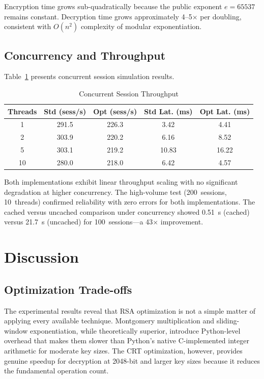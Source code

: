 \documentclass[conference]{IEEEtran}
\begin{document}
Encryption time grows sub-quadratically because the public exponent $e = 65537$ remains constant. Decryption time grows approximately 4--5$\times$ per doubling, consistent with $O(n^2)$ complexity of modular exponentiation.

\subsection{Concurrency and Throughput}

Table~\ref{tab:concurrency} presents concurrent session simulation results.

\begin{table}[htbp]
\caption{Concurrent Session Throughput}
\begin{center}
\begin{tabular}{|c|c|c|c|c|}
\hline
\textbf{Threads} & \textbf{Std (sess/s)} & \textbf{Opt (sess/s)} & \textbf{Std Lat. (ms)} & \textbf{Opt Lat. (ms)} \\
\hline
1 & 291.5 & 226.3 & 3.42 & 4.41 \\
\hline
2 & 303.9 & 220.2 & 6.16 & 8.52 \\
\hline
5 & 303.1 & 219.2 & 10.83 & 16.22 \\
\hline
10 & 280.0 & 218.0 & 6.42 & 4.57 \\
\hline
\end{tabular}
\label{tab:concurrency}
\end{center}
\end{table}

Both implementations exhibit linear throughput scaling with no significant degradation at higher concurrency. The high-volume test (200~sessions, 10~threads) confirmed reliability with zero errors for both implementations. The cached versus uncached comparison under concurrency showed 0.51~s (cached) versus 21.7~s (uncached) for 100~sessions---a 43$\times$ improvement.

\section{Discussion}
\label{sec:discussion}

\subsection{Optimization Trade-offs}

The experimental results reveal that RSA optimization is not a simple matter of applying every available technique. Montgomery multiplication and sliding-window exponentiation, while theoretically superior, introduce Python-level overhead that makes them slower than Python's native C-implemented integer arithmetic for moderate key sizes. The CRT optimization, however, provides genuine speedup for decryption at 2048-bit and larger key sizes because it reduces the fundamental operation count.
\end{document}
